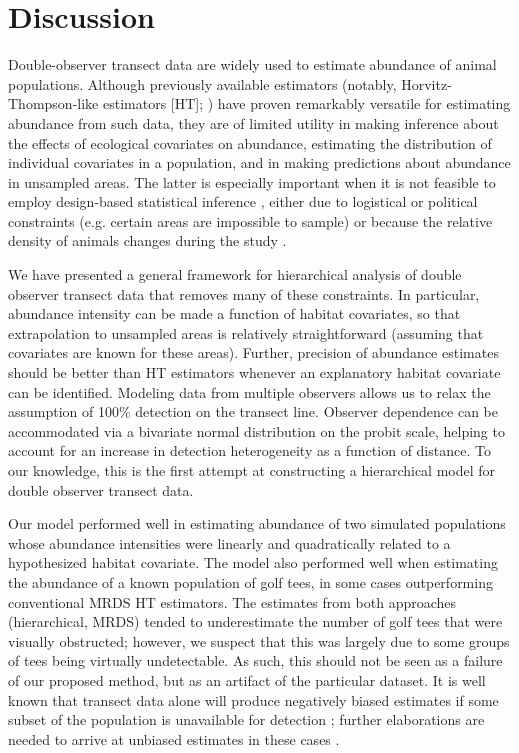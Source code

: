 \documentclass[10pt]{article}
\begin{document}
\section*{Discussion}

Double-observer transect data are widely used to estimate abundance of animal populations. Although previously available estimators (notably, Horvitz-Thompson-like estimators [HT]; \cite{BorchersEtAl2002}) have proven remarkably versatile for estimating abundance from such data, they are of limited utility in making inference about the effects of ecological covariates on abundance, estimating the distribution of individual covariates in a population, and in making predictions about abundance in unsampled areas.
The latter is especially important when it is not feasible to employ design-based statistical inference \cite{Cochran1977}, either due to logistical or political constraints (e.g. certain areas are impossible to sample) or because the relative density of animals changes during the study \cite{VerHoefEtAl2011}.

We have presented a general framework for hierarchical analysis of double observer transect data that removes many of these constraints.  In particular, abundance intensity can be made a function of habitat covariates, so that extrapolation to unsampled areas is relatively straightforward (assuming that covariates are known for these areas).  Further, precision of abundance estimates should be better than HT estimators whenever an explanatory habitat covariate can be identified.  Modeling data from multiple observers allows us to relax the assumption of 100\% detection on the transect line.  Observer dependence can be accommodated via a bivariate normal distribution on the probit scale, helping to account for an increase in detection heterogeneity as a function of distance.  To our knowledge, this is the first attempt at constructing a hierarchical model for double observer transect data.

Our model performed well in estimating abundance of two simulated populations whose abundance intensities were linearly and quadratically related to a hypothesized habitat covariate.  The model also performed well when estimating the abundance of a known population of golf tees, in some cases outperforming conventional MRDS HT estimators.  The estimates from both approaches (hierarchical, MRDS) tended to underestimate the number of golf tees that were visually obstructed; however, we suspect that this was largely due to some groups of tees being virtually undetectable.  As such, this should not be seen as a failure of our proposed method, but as an artifact of the particular dataset.  It is well known that transect data alone will produce negatively biased estimates if some subset of the population is unavailable for detection \cite{McLaren1961}; further elaborations are needed to arrive at unbiased estimates in these cases \cite{Marsh1989,Bengtson2005,DiefenbachEtAl2007}.
\end{document}
